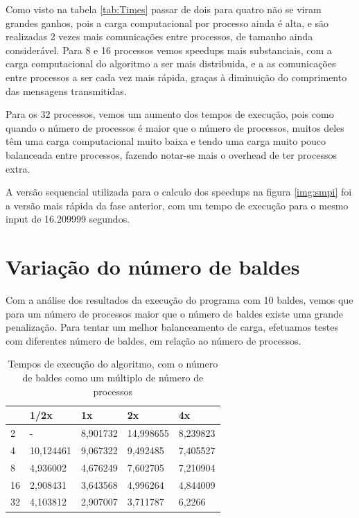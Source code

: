 \documentclass[a4paper]{report}
\begin{document}
Como visto na tabela \ref{tab:Times} passar de dois para quatro não
se viram grandes ganhos, pois a carga computacional por processo ainda
é alta, e são realizadas 2 vezes mais comunicações entre processos,
de tamanho ainda considerável. Para 8 e 16 processos vemos speedups
mais substanciais, com a carga computacional do algoritmo a ser
mais distribuida, e a as comunicações entre processos a ser cada
vez mais rápida, graças à diminuição do comprimento das mensagens transmitidas.

Para os 32 processos, vemos um aumento dos tempos de execução, pois como quando
o número de processos é maior que o número de processos, muitos deles têm uma
carga computacional muito baixa e tendo uma carga muito pouco balanceada entre
processos, fazendo notar-se mais o overhead de ter processos extra.

A versão sequencial utilizada para o calculo dos speedups na figura
\ref{img:smpi} foi a versão mais
rápida da fase anterior, com um tempo de execução para o mesmo input de
16.209999 segundos. 
\section{Variação do número de baldes}

Com a análise dos resultados da execução do programa com 10 baldes, vemos que
para um número de processos maior que o número de baldes existe uma grande
penalização. Para tentar um melhor balanceamento de carga, efetuamos testes com
diferentes número de baldes, em relação ao número de processos.

\begin{table}[h]
    \centering
    \begin{tabular}{|l|l|l|l|l|}
        \hline
   & 1/2x      & 1x       & 2x        & 4x       \\ \hline
        2  & -         & 8,901732 & 14,998655 & 8,239823 \\ \hline
        4  & 10,124461 & 9,067322 & 9,492485  & 7,405527 \\ \hline
        8  & 4,936002  & 4,676249 & 7,602705  & 7,210904 \\ \hline
        16 & 2,908431  & 3,643568 & 4,996264  & 4,844009 \\ \hline
        32 & 4,103812  & 2,907007 & 3,711787  & 6,2266   \\ \hline
    \end{tabular}
    \caption{\label{tab:varb}Tempos de execução do algoritmo, com o número de
    baldes como um múltiplo de número de processos}
\end{table}
\end{document}
